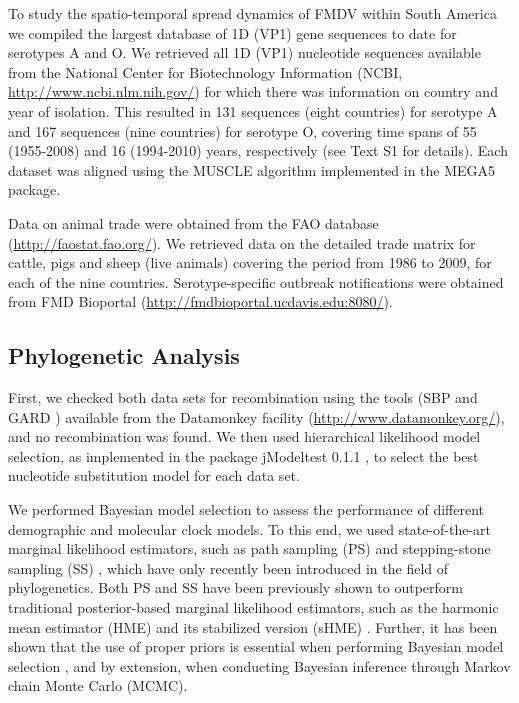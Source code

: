 \documentclass[10pt]{article}
\begin{document}
To study the spatio-temporal spread dynamics of FMDV within South America we compiled the largest database of 1D (VP1) gene sequences to date for serotypes A and O.
We retrieved all 1D (VP1) nucleotide sequences available from the National Center for Biotechnology Information (NCBI, \url{ http://www.ncbi.nlm.nih.gov/}) for which there was information on country and year of isolation.
This resulted in 131 sequences (eight countries) for serotype A and 167 sequences (nine countries) for serotype O, covering time spans of 55 (1955-2008) and 16 (1994-2010) years, respectively (see Text S1 for details).
Each dataset was aligned using the MUSCLE algorithm implemented in the MEGA5 \cite{MEGA} package.

Data on animal trade were obtained from the FAO database (\url{http://faostat.fao.org/}).
We retrieved data on the detailed trade matrix for cattle, pigs and sheep (live animals) covering the period from 1986 to 2009, for each of the nine countries.
Serotype-specific outbreak notifications were obtained from FMD Bioportal (\url{http://fmdbioportal.ucdavis.edu:8080/}).

\subsection*{Phylogenetic Analysis}

First, we checked both data sets for recombination using the tools (SBP and GARD \cite{sbpgard}) available from the Datamonkey facility (\url{http://www.datamonkey.org/}), and no recombination was found.
We then used hierarchical likelihood model selection, as implemented in the package jModeltest 0.1.1 \cite{jmodel}, to select the best nucleotide substitution model for each data set.

We performed Bayesian model selection to assess the performance of different demographic and molecular clock models.
To this end, we used state-of-the-art marginal likelihood estimators, such as path sampling (PS) \cite{LartillotPhilippe} and stepping-stone sampling (SS) \cite{Xie}, which have only recently been introduced in the field of phylogenetics.
Both PS and SS have been previously shown to outperform traditional posterior-based marginal likelihood estimators, such as the harmonic mean estimator (HME) and its stabilized version (sHME) \cite{LartillotPhilippe,Xie,Baele2012,Baele2013a,Baele2013b}.
Further, it has been shown that the use of proper priors is essential when performing Bayesian model selection \cite{Baele2013a}, and by extension, when conducting Bayesian inference through Markov chain Monte Carlo (MCMC).
                                                                       
\end{document}
